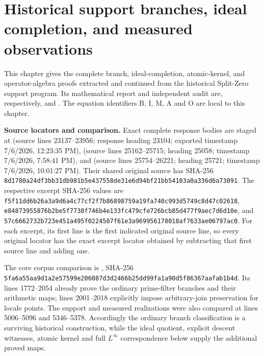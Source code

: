 \section{Historical support branches, ideal completion, and measured observations}\label{historical-support-historical-support-branches-ideal-completion-and-measured-observations}

This chapter gives the complete branch, ideal-completion, atomic-kernel,
and operator-algebra proofs extracted and continued from the historical
Split-Zero support program. Its mathematical report and independent audit
are, respectively,  and
.
The equation identifiers B, I, M, A and O are local to this chapter.

\textbf{Source locators and comparison.} Exact complete response bodies are staged at
(source lines 23137--23956; response heading 23104; exported timestamp
7/6/2026, 12:23:35 PM),
(source lines 25162--25715; heading 25058; timestamp 7/6/2026, 7:58:41 PM), and
(source lines 25754--26221; heading 25721; timestamp 7/6/2026, 10:01:27 PM).
Their shared original source has SHA-256
\nolinkurl{8d1780a24df3bb31db981b5e437558de31e6d94bf21bb54103a0a336d6a73091}.
The respective excerpt SHA-256 values are
\nolinkurl{f5f11dd6b26a3a9d6a4c77cf2f7b86898759a19fa740c993d5749c8d47c02618},
\nolinkurl{e84873955876b2be5f7738f746b4e133fc479cfe726bcb85d477f9aec7d6d10e}, and
\nolinkurl{57c6662732b723e451a495f0224507f61e3a969956178018af7633ae06797ac0}.
For each excerpt, its first line is the first indicated original source
line, so every original locator has the exact excerpt locator obtained by
subtracting that first source line and adding one.

The core corpus comparison is
,
SHA-256 \nolinkurl{5fa6a55aa9d1a2e57599e206087d3d2466b25dd99fa1a90d5f86367aafab1b4d}.
Its lines 1772--2054 already prove the ordinary prime-filter branches and
their arithmetic maps; lines 2001--2018 explicitly impose arbitrary-join
preservation for locale points. The support and measured realizations were
also compared at lines 5006--5096 and 5346--5378. Accordingly the ordinary
branch classification is a surviving historical construction, while the
ideal quotient, explicit descent witnesses, atomic kernel and full
\(L^\infty\) correspondence below supply the additional proved maps.


